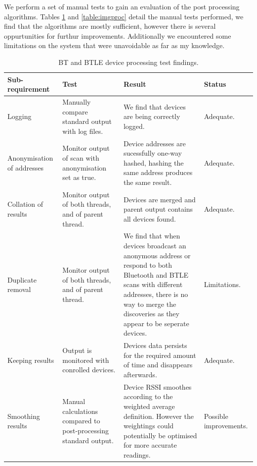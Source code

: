 \documentclass{l4proj}
\begin{document}
We perform a set of manual tests to gain an evaluation of the post processing algorithms. Tables \ref{table:scanproc} and \ref{table:imgproc} detail the manual tests performed, we find that the algorithms are mostly sufficient, however there is several oppurtunities for furthur improvements. Additionally we encountered some limitations on the system that were unavoidable as far as my knowledge.
\begin{table}
\begin{tabularx}{\textwidth}{|X|X|X|X|}
\hline
\textbf{Sub-requirement} & \textbf{Test} & \textbf{Result} & \textbf{Status}\tabularnewline
\hline
Logging & Manually compare standard output with log files. &  We find that devices are being correctly logged. & Adequate. \\
\hline 
Anonymisation of addresses & Monitor output of scan with anonymisation set as true. & Device addresses are sucessfully one-way hashed, hashing the same address produces the same result. & Adequate. \\
\hline
Collation of results & Monitor output of both threads, and of parent thread. & Devices are merged and parent output contains all devices found. & Adequate.\\
\hline
Duplicate removal & Monitor output of both threads, and of parent thread. & We find that when devices broadcast an anonymous address or respond to both Bluetooth and BTLE scans with different addresses, there is no way to merge the discoveries as they appear to be seperate devices. & Limitations. \\
\hline
Keeping results & Output is monitored with conrolled devices. & Devices data persists for the required amount of time and disappears afterwards. &  Adequate.\\ 
\hline
Smoothing results  & Manual calculations compared to post-processing standard output. & Device RSSI smoothes according to the weighted average definition. However the weightings could potentially be optimised for more accurate readings. & Possible improvements.\\
\hline
\end{tabularx}
\caption{BT and BTLE device processing test findings.}
\label{table:scanproc}
\end{table}
\end{document}
